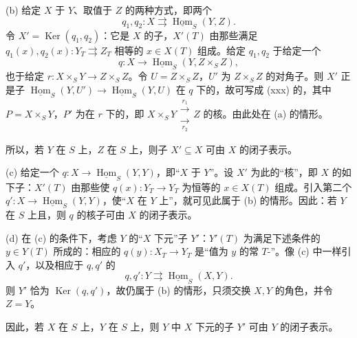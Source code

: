 (b) 给定 $X$ 于 $Y$、取值于 $Z$ 的两种方式，即两个
\[
q_1,q_2:X\rightrightarrows\underline{\operatorname{Hom}}_S(Y,Z).
\]
令 $X'=\operatorname{Ker}(q_1,q_2)$：它是 $X$ 的子，$X'(T)$ 由那些满足 $q_1(x),q_2(x):Y_T\rightrightarrows Z_T$ 相等的 $x\in X(T)$ 组成。给定 $q_1,q_2$ 于给定一个
\[
q:X\longrightarrow\underline{\operatorname{Hom}}_S(Y,Z\times_SZ),
\]
也于给定 $r:X\times_SY\to Z\times_SZ$。令 $U=Z\times_SZ$，$U'$ 为 $Z\times_SZ$ 的对角子。则 $X'$ 正是子 $\underline{\operatorname{Hom}}_S(Y,U')\to\underline{\operatorname{Hom}}_S(Y,U)$ 在 $q$ 下的，故可写成 (xxx) 的，其中 $P=X\times_SY$，$P'$ 为在 $r$ 下的，即 $X\times_SY\mathrel{\substack{\xrightarrow{r_1}\\[-.5ex]\xrightarrow[r_2]{}}}Z$ 的核。由此处在 (a) 的情形。

所以，若 $Y$ 在 $S$ 上，$Z$ 在 $S$ 上，则子 $X'\subseteq X$ 可由 $X$ 的闭子表示。

(c) 给定一个 $q:X\to\underline{\operatorname{Hom}}_S(Y,Y)$，即“$X$ 于 $Y$”。设 $X'$ 为此的“核”，即 $X$ 的如下子：$X'(T)$ 由那些使 $q(x):Y_T\to Y_T$ 为恒等的 $x\in X(T)$ 组成。引入第二个 $q':X\to\underline{\operatorname{Hom}}_S(Y,Y)$，使“$X$ 在 $Y$ 上”，就可见此属于 (b) 的情形。因此：若 $Y$ 在 $S$ 上且，则 $q$ 的核子可由 $X$ 的闭子表示。

(d) 在 (c) 的条件下，考虑 $Y$ 的“$X$ 下元”子 $Y'$：$Y'(T)$ 为满足下述条件的 $y\in Y(T)$ 所成的：相应的 $q(y):X_T\to Y_T$ 是“值为 $y$ 的常 $T$-”。像 (c) 中一样引入 $q'$，以及相应于 $q,q'$ 的
\[
q,q':Y\rightrightarrows\underline{\operatorname{Hom}}_S(X,Y).
\]
则 $Y'$ 恰为 $\operatorname{Ker}(q,q')$，故仍属于 (b) 的情形，只须交换 $X,Y$ 的角色，并令 $Z=Y$。

因此，若 $X$ 在 $S$ 上，$Y$ 在 $S$ 上，则 $Y$ 中 $X$ 下元的子 $Y'$ 可由 $Y$ 的闭子表示。

